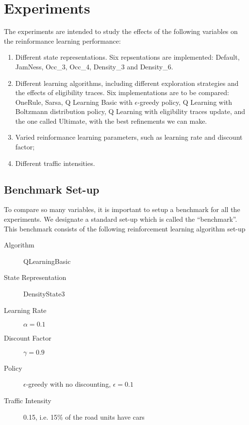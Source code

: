 \section{Experiments}

The experiments are intended to study the effects of the following variables on the reinformance learning performance:

\begin{enumerate}
\item Different state representations. Six repsentations are implemented: Default, JamNess, Occ\_3, Occ\_4, Density\_3 and Density\_6. 

\item Different learning algorithms, including different exploration strategies and the effects of eligibility traces. Six implementations are to be compared: OneRule, Sarsa, Q Learning Basic with $\epsilon$-greedy policy, Q Learning with Boltzmann distribution policy, Q Learning with eligibility traces update, and the one called Ultimate, with the best refinements we can make.

\item Varied reinformance learning parameters, such as learning rate and discount factor;

\item Different traffic intensities.

\end{enumerate}

\subsection{Benchmark Set-up}

To compare so many variables, it is important to setup a benchmark for all the experiments.
We designate a standard set-up which is called the ``benchmark''. This
benchmark consists of the following reinforcement learning
algorithm set-up

\begin{description}
\item[Algorithm] QLearningBasic
\item[State Representation] DensityState3
\item[Learning Rate] $\alpha = 0.1$
\item[Discount Factor] $\gamma = 0.9$
\item[Policy] $\epsilon$-greedy with no discounting, $\epsilon = 0.1$
\item[Traffic Intensity] 0.15, i.e. 15\% of the road units have cars
\end{description}

